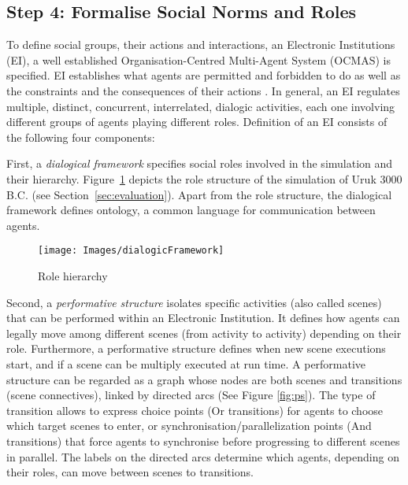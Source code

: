 \documentclass[graybox]{svmult}
\begin{document}
\subsection{Step 4: Formalise Social Norms and Roles}

\label{sec:step4}

To define social groups, their actions and interactions, an Electronic Institutions (EI), a well established Organisation-Centred Multi-Agent System (OCMAS) is specified. EI establishes what agents are permitted and forbidden to do as well as the constraints and the consequences of their actions \cite{esteva2003}. In general, an EI regulates multiple, distinct, concurrent, interrelated, dialogic activities, each one involving different groups of agents playing different roles. Definition of an EI consists of the following four components:

First, a \textit{dialogical framework} specifies social roles involved in the simulation and their hierarchy. Figure~\ref{fig:df} depicts the role structure of the simulation of Uruk 3000 B.C. (see Section~\ref{sec:evaluation}). Apart from the role structure, the dialogical framework defines ontology, a common language for communication between agents. 

\begin{figure}[t]
\sidecaption[t]
\texttt{[image: Images/dialogicFramework]}
\caption{Role hierarchy}
\label{fig:df}       %
\end{figure}



Second, a \textit{performative structure} isolates specific activities (also called scenes) that can be performed within an Electronic Institution. It defines how agents can legally move among different scenes (from activity to activity) depending on their role. Furthermore, a performative structure defines when new scene executions start, and if a scene can be multiply executed at run time. A performative structure can be regarded as a graph whose nodes are both scenes and transitions (scene connectives), linked by directed arcs (See Figure \ref{fig:ps}). The type of transition allows to express choice points (Or transitions) for agents to choose which target scenes to enter, or synchronisation/parallelization points (And transitions) that force agents to synchronise before progressing to different scenes in parallel. The labels on the directed arcs determine which agents, depending on their roles, can move between scenes to transitions.
\end{document}
